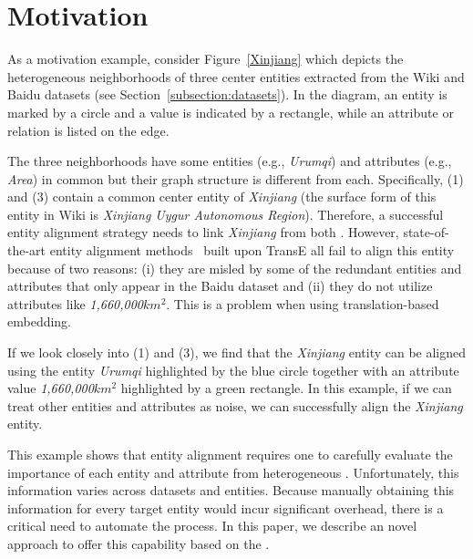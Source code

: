 \section{Motivation}
As a motivation example, consider Figure~\ref{Xinjiang} which depicts the heterogeneous neighborhoods of three center entities extracted from the Wiki and Baidu
datasets (see Section~\ref{subsection:datasets}). In the diagram, an entity is marked by a circle and a value is indicated by a rectangle,
while an attribute or relation is listed on the edge.

The three neighborhoods have some entities (e.g., \emph{Urumqi}) and attributes (e.g., \emph{Area}) in common but their graph structure is different from
each. Specifically, (1) and (3) contain a common center entity of \emph{Xinjiang} (the surface form of this entity in Wiki is \emph{Xinjiang
Uygur Autonomous Region}). Therefore, a successful entity alignment strategy needs to link \emph{Xinjiang} from both \KGs. However,
state-of-the-art entity alignment methods~\cite{hao2016joint,chen2016multilingual,sun2017cross,zhu2017iterative} built upon TransE all fail
to align this entity because of two reasons: (i) they are misled by some of the redundant entities and attributes that only appear in the
Baidu dataset and (ii) they do not utilize attributes like \emph{1,660,000$km^2$}. This is a problem when using translation-based
embedding.

If we look closely into (1) and (3), we find that the \emph{Xinjiang} entity can be aligned using the entity \emph{Urumqi} highlighted by
the blue circle together with an attribute value \emph{1,660,000$km^2$} highlighted by a green rectangle. In this example, if we can treat
other entities and attributes as noise, we can successfully align the \emph{Xinjiang} entity.

This example shows that entity alignment requires one to carefully evaluate the importance of each entity and attribute from heterogeneous
\KGs. Unfortunately, this information varies across datasets and entities. Because manually obtaining this information for every target
entity would incur significant overhead, there is a critical need to automate the process. In this paper, we describe an novel approach to
offer this capability based on the \RGCN.
